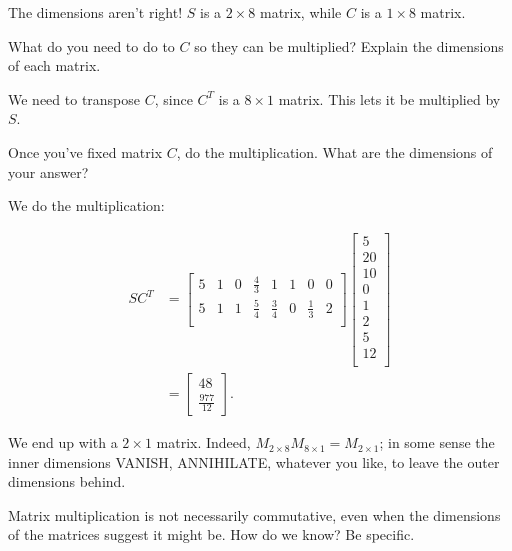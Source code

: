 \documentclass[../key.tex]{subfiles}
\begin{document}
The dimensions aren't right! $S$ is a $2\times 8$ matrix, while $C$ is a $1\times 8$ matrix.

\begin{inner_problem}
\item What do you need to do to $C$ so they can be multiplied? Explain the dimensions of each matrix.
\end{inner_problem}

We need to transpose $C$, since $C^T$ is a $8\times 1$ matrix. This lets it be multiplied by $S$.

\begin{inner_problem}
\item Once you've fixed matrix $C$, do the multiplication. What are the dimensions of your answer?
\end{inner_problem}

We do the multiplication:

\begin{align*}
SC^T &= \begin{bmatrix}
5     & 1      & 0     & \frac{4}{3}   & 1    & 1    & 0     & 0 \\
5     & 1      & 1     & \frac{5}{4}   & \frac{3}{4}  & 0    & \frac{1}{3}   & 2 \\
\end{bmatrix}\begin{bmatrix}
5 \\
20 \\
10 \\
0 \\
1 \\
2 \\
5 \\
12 \\
\end{bmatrix} \\
&= \begin{bmatrix}
48 \\
\frac{977}{12}
\end{bmatrix}.
\end{align*}

We end up with a $2\times 1$ matrix. Indeed, $M_{2\times 8}M_{8\times 1} = M_{2\times 1}$; in some sense the inner dimensions VANISH, ANNIHILATE, whatever you like, to leave the outer dimensions behind.

\begin{outer_problem}
\item Matrix multiplication is not necessarily commutative, even when the dimensions of the matrices suggest it might be. How do we know? Be specific.
\end{outer_problem}
\end{document}
